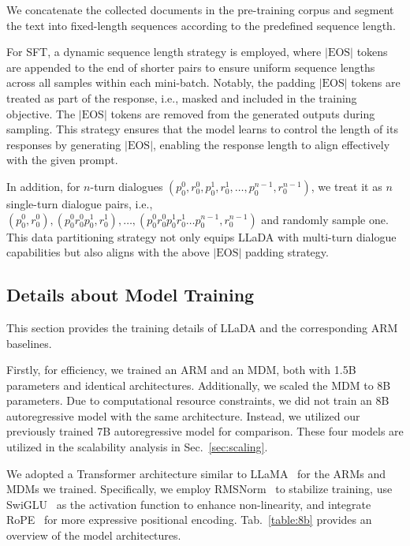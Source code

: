\documentclass{article}
\begin{document}
We concatenate the collected documents in the pre-training corpus and segment the text into fixed-length sequences according to the predefined sequence length.

For SFT, a dynamic sequence length strategy is employed, where $|\text{EOS}|$ tokens are appended to the end of shorter pairs to ensure uniform sequence lengths across all samples within each mini-batch. Notably, the padding $|\text{EOS}|$ tokens are treated as part of the response, i.e., masked and included in the training objective. The $|\text{EOS}|$ tokens are removed from the generated outputs during sampling. This strategy ensures that the model learns to control the length of its responses by generating $|\text{EOS}|$, enabling the response length to align effectively with the given prompt.

In addition, for $n$-turn dialogues $(p_0^0, r_0^0, p_0^1, r_0^1, \dots, p_0^{n-1}, r_0^{n-1})$, we treat it as $n$ single-turn dialogue pairs, i.e., $(p_0^0, r_0^0), (p_0^0r_0^0p_0^1, r_0^1), \dots, (p_0^0r_0^0p_0^1r_0^1\dots p_0^{n-1}, r_0^{n-1})$ and randomly sample one. This data partitioning strategy not only equips LLaDA with multi-turn dialogue capabilities but also aligns with the above $|\text{EOS}|$ padding strategy.


\subsection{Details about Model Training}
\label{app:exp-1b-config}
This section provides the training details of LLaDA and the corresponding ARM baselines.

Firstly, for efficiency, we trained an ARM and an MDM, both with 1.5B parameters and identical architectures. Additionally, we scaled the MDM to 8B parameters. Due to computational resource constraints, we did not train an 8B autoregressive model with the same architecture. Instead, we utilized our previously trained 7B autoregressive model for comparison. These four models are utilized in the scalability analysis in Sec.~\ref{sec:scaling}.

We adopted a Transformer architecture similar to LLaMA~\cite{dubey2024llama, touvron2023llama2} for the ARMs and MDMs we trained. Specifically, we employ RMSNorm~\cite{zhang2019root} to stabilize training, use SwiGLU~\cite{shazeer2020glu} as the activation function to enhance non-linearity, and integrate RoPE~\cite{su2024roformer} for more expressive positional encoding. Tab.~\ref{table:8b} provides an overview of the model architectures.
\end{document}
